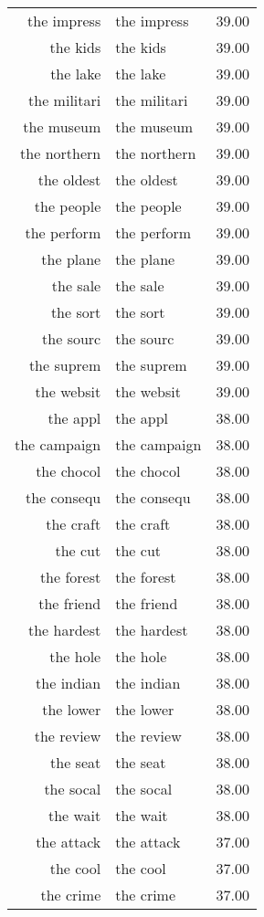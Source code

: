 \begin{table}[ht]
\begin{tabular}{rlr}
  the impress & the impress & 39.00 \\ 
  the kids & the kids & 39.00 \\ 
  the lake & the lake & 39.00 \\ 
  the militari & the militari & 39.00 \\ 
  the museum & the museum & 39.00 \\ 
  the northern & the northern & 39.00 \\ 
  the oldest & the oldest & 39.00 \\ 
  the people & the people & 39.00 \\ 
  the perform & the perform & 39.00 \\ 
  the plane & the plane & 39.00 \\ 
  the sale & the sale & 39.00 \\ 
  the sort & the sort & 39.00 \\ 
  the sourc & the sourc & 39.00 \\ 
  the suprem & the suprem & 39.00 \\ 
  the websit & the websit & 39.00 \\ 
  the appl & the appl & 38.00 \\ 
  the campaign & the campaign & 38.00 \\ 
  the chocol & the chocol & 38.00 \\ 
  the consequ & the consequ & 38.00 \\ 
  the craft & the craft & 38.00 \\ 
  the cut & the cut & 38.00 \\ 
  the forest & the forest & 38.00 \\ 
  the friend & the friend & 38.00 \\ 
  the hardest & the hardest & 38.00 \\ 
  the hole & the hole & 38.00 \\ 
  the indian & the indian & 38.00 \\ 
  the lower & the lower & 38.00 \\ 
  the review & the review & 38.00 \\ 
  the seat & the seat & 38.00 \\ 
  the socal & the socal & 38.00 \\ 
  the wait & the wait & 38.00 \\ 
  the attack & the attack & 37.00 \\ 
  the cool & the cool & 37.00 \\ 
  the crime & the crime & 37.00 \\ 

\end{tabular}
\end{table}
